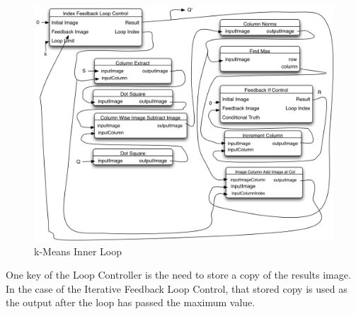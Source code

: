 \documentclass[11pt]{article}
\begin{document}
\begin{figure}[htbp] %
   \centering
   \includegraphics[width=6in]{kMeansInnerLoop.jpg} 
   \caption{k-Means Inner Loop}
   \label{kMeansOuterLoop}
\end{figure}

One key of the Loop Controller is the need to store a copy of the results image.  In the case of the Iterative Feedback Loop Control, that stored copy is used as the output after the loop has passed the maximum value.



\end{document}
